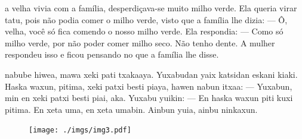 
 a velha vivia com
a família, desperdiçava-se
muito milho verde.
Ela queria virar tatu, pois
não podia comer o milho verde,
visto que a família lhe dizia:\break
--- Ô, velha, você só fica
comendo o nosso milho verde.
Ela respondia:\break
--- Como só milho verde, por
não poder comer milho seco.
Não tenho dente.\break
A mulher respondeu isso
e ficou pensando no que
a família lhe disse.

\vspace{2em}

 nabube hiwea,
mawa xeki pati txakaaya.
Yuxabudan yaix katsidan
eskani kiaki. Haska waxun,
pitima, xeki patxi besti piaya,
hawen nabun itxaa:\break
--- Yuxabun, min en xeki
patxi besti piai, aka.
Yuxabu yuikin:\break
--- En haska waxun piti kuxi
pitima. En xeta uma, en xeta
umabin.\break
Ainbun yuia, ainbu
ninkaxun.

\vspace*{\fill}

\pagebreak
\thispagestyle{empty}
\begin{figure}
\vspace*{-.5cm}
\hspace*{-2.2cm}\texttt{[image: ./imgs/img3.pdf]}
\end{figure}

\chapter*{}

\vspace*{-\baselineskip}

